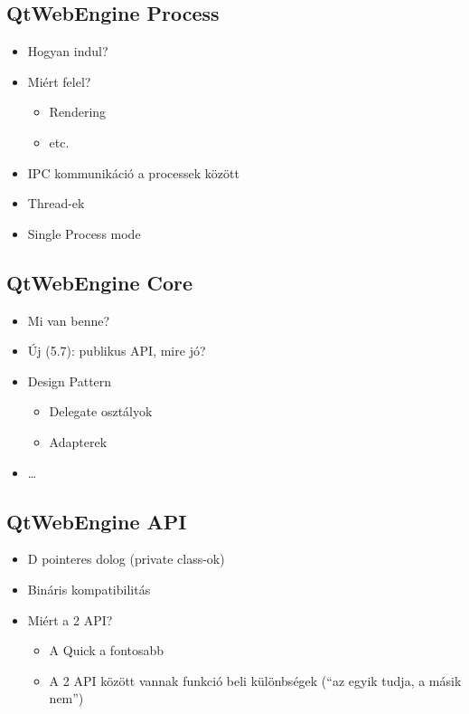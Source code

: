 \documentclass[12pt]{report}
\begin{document}
\subsection{QtWebEngine Process}
\begin{itemize}
    \item Hogyan indul?
    \item Miért felel?
        \begin{itemize}
            \item Rendering
            \item etc.
        \end{itemize}
    \item IPC kommunikáció a processek között
    \item Thread-ek
    \item Single Process mode
\end{itemize}

\subsection{QtWebEngine Core}
\begin{itemize}
    \item Mi van benne?
    \item Új (5.7): publikus API, mire jó?
    \item Design Pattern
        \begin{itemize}
            \item Delegate osztályok
            \item Adapterek
        \end{itemize}
    \item \dots
\end{itemize}

\subsection{QtWebEngine API}
\begin{itemize}
    \item D pointeres dolog (private class-ok)
    \item Bináris kompatibilitás
    \item Miért a 2 API?
    \begin{itemize}
        \item A Quick a fontosabb
        \item A 2 API között vannak funkció beli különbségek (``az egyik tudja, a másik nem'')
    \end{itemize}
\end{itemize}
\end{document}
